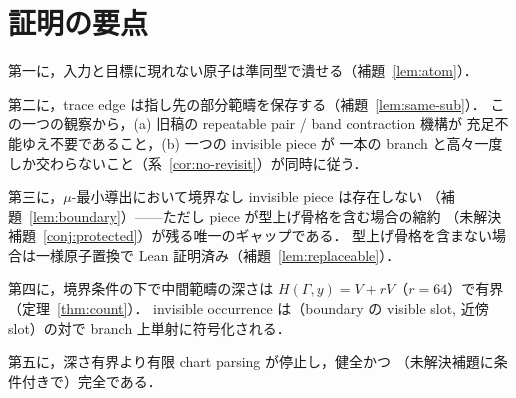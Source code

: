 \documentclass[paper=a4,fontsize=10pt,jafontscale=0.92]{jlreq}
\theoremstyle{plain}
\theoremstyle{definition}
\theoremstyle{remark}
\begin{document}
\section*{証明の要点}

第一に，入力と目標に現れない原子は準同型で潰せる（補題~\ref{lem:atom}）．

第二に，trace edge は指し先の部分範疇を保存する（補題~\ref{lem:same-sub}）．
この一つの観察から，(a) 旧稿の repeatable pair / band contraction 機構が
充足不能ゆえ不要であること，(b) 一つの invisible piece が
一本の branch と高々一度しか交わらないこと（系~\ref{cor:no-revisit}）が同時に従う．

第三に，$\mu$-最小導出において境界なし invisible piece は存在しない
（補題~\ref{lem:boundary}）——ただし piece が型上げ骨格を含む場合の縮約
（未解決補題~\ref{conj:protected}）が残る唯一のギャップである．
型上げ骨格を含まない場合は一様原子置換で Lean 証明済み（補題~\ref{lem:replaceable}）．

第四に，境界条件の下で中間範疇の深さは
$H(\Gamma,y) = V + rV$（$r = 64$）で有界（定理~\ref{thm:count}）．
invisible occurrence は（boundary の visible slot, 近傍 slot）の対で
branch 上単射に符号化される．

第五に，深さ有界より有限 chart parsing が停止し，健全かつ
（未解決補題に条件付きで）完全である．
\end{document}
